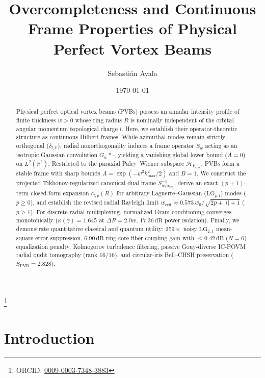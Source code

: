 \documentclass[aps,pra,reprint,amsmath,amssymb,floatfix,longbibliography]{revtex4-2}
\providecommand{\abs}[1]{\lvert#1\rvert}
\begin{document}
\title{Overcompleteness and Continuous Frame Properties of Physical Perfect Vortex Beams}

\author{Sebasti\'an Ayala}
\thanks{ORCID: \href{https://orcid.org/0009-0003-7348-3883}{0009-0003-7348-3883}}

\date{\today}

\begin{abstract}
Physical perfect optical vortex beams (PVBs) possess an annular intensity profile of finite thickness $w > 0$ whose ring radius $R$ is nominally independent of the orbital angular momentum topological charge $l$. Here, we establish their operator-theoretic structure as continuous Hilbert frames. While azimuthal modes remain strictly orthogonal ($\delta_{l,l'}$), radial nonorthogonality induces a frame operator $S_w$ acting as an isotropic Gaussian convolution $G_w * \cdot$, yielding a vanishing global lower bound ($A = 0$) on $L^2(\mathbb{R}^2)$. Restricted to the paraxial Paley--Wiener subspace $\mathcal{H}_{k_{\max}}$, PVBs form a stable frame with sharp bounds $A = \exp(-w^2 k_{\max}^2/2)$ and $B = 1$. We construct the projected Tikhonov-regularized canonical dual frame $S_{w,\alpha_{\mathrm{reg}}}^{-1}$, derive an exact $(p+1)$-term closed-form expansion $c_{l,p}(R)$ for arbitrary Laguerre--Gaussian ($\mathrm{LG}_{p,l}$) modes ($p \ge 0$), and establish the revised radial Rayleigh limit $w_{\mathrm{crit}} \approx 0.573\,w_0/\sqrt{2p+\abs{l}+1}$ ($p \ge 1$). For discrete radial multiplexing, normalized Gram conditioning converges monotonically ($\kappa(\gamma) = 1.645$ at $\Delta R = 2.0w$, $17.36\,\mathrm{dB}$ power isolation). Finally, we demonstrate quantitative classical and quantum utility: $259\times$ noisy $\mathrm{LG}_{2,1}$ mean-square-error suppression, $6.90\,\mathrm{dB}$ ring-core fiber coupling gain with $\le 0.42\,\mathrm{dB}$ ($N=6$) equalization penalty, Kolmogorov turbulence filtering, passive Gouy-diverse IC-POVM radial qudit tomography (rank $16/16$), and circular-iris Bell--CHSH preservation ($S_{\mathrm{PVB}} = 2.828$).
\end{abstract}

\maketitle

\section{Introduction}
\label{sec:intro}
\end{document}
